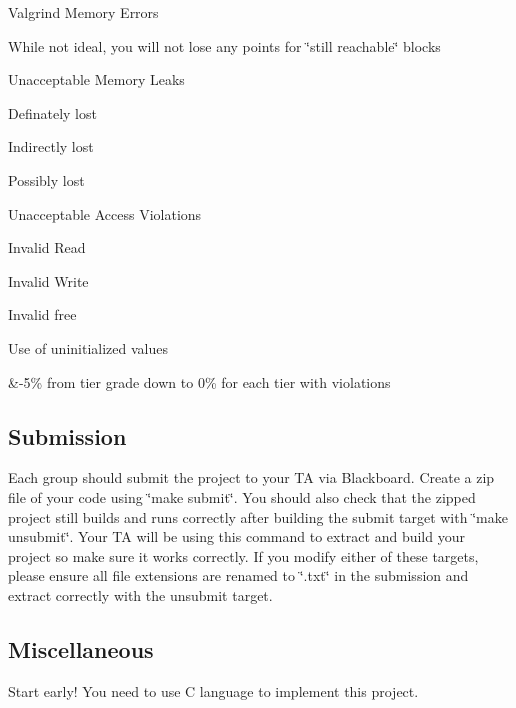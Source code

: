 \begin{TabularC}{2}
\begin{DoxyItemize}
\item Valgrind Memory Errors  
\begin{DoxyItemize}
\item While not ideal, you will not lose any points for \char`\"{}still reachable\char`\"{} blocks  
\item Unacceptable Memory Leaks  
\begin{DoxyItemize}
\item Definately lost  
\item Indirectly lost  
\item Possibly lost  
\end{DoxyItemize}
\item Unacceptable Access Violations  
\begin{DoxyItemize}
\item Invalid Read  
\item Invalid Write  
\item Invalid free  
\item Use of uninitialized values  
\end{DoxyItemize}
\end{DoxyItemize}
\end{DoxyItemize}&-\/5\% from tier grade down to 0\% for each tier with violations   \\
\end{TabularC}


\subsection*{Submission}

Each group should submit the project to your T\-A via Blackboard. Create a zip file of your code using \char`\"{}make submit\char`\"{}. You should also check that the zipped project still builds and runs correctly after building the submit target with \char`\"{}make unsubmit\char`\"{}. Your T\-A will be using this command to extract and build your project so make sure it works correctly. If you modify either of these targets, please ensure all file extensions are renamed to \char`\"{}.\-txt\char`\"{} in the submission and extract correctly with the unsubmit target.

\subsection*{Miscellaneous}

Start early! You need to use C language to implement this project. 